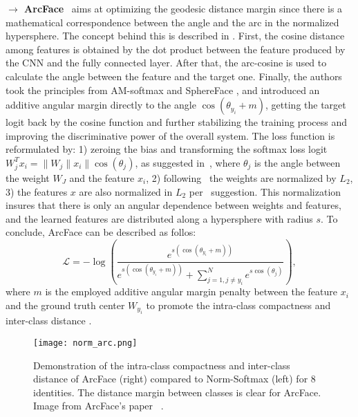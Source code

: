 \documentclass[class=report, crop=false, a4paper, 12pt]{standalone}
\begin{document}
\noindent\textbf{$\rightarrow$ ArcFace}~\autocite{dengArcFaceAdditiveAngular} aims at optimizing the geodesic distance margin since there is a mathematical correspondence between the angle and the arc in the normalized hypersphere. The concept behind this is described in . First, the cosine distance among features is obtained by the dot product between the feature produced by the CNN and the fully connected layer. After that, the arc-cosine is used to calculate the angle between the feature and the target one. Finally, the authors took the principles from AM-softmax \autocite{wangAdditiveMarginSoftmax2018} and SphereFace \autocite{liuSphereFaceDeepHypersphere2018}, and introduced an additive angular margin directly to the angle $\cos{(\theta_{y_i}+m)}$, getting the target logit back by the cosine function and further stabilizing the training process and improving the discriminative power of the overall system. The loss function is reformulated by: 1) zeroing the bias and transforming the softmax loss logit $W^{T}_{j}x_i=\|W_j\|x_i\|\cos{(\theta_j)}$, as suggested in~\autocite{liuSphereFaceDeepHypersphere2018}, where $\theta_j$ is the angle between the weight $W_J$ and the feature $x_i$, 2) following~\autocite{wangNormFaceL2Hypersphere2017,liuSphereFaceDeepHypersphere2018,wangCosFaceLargeMargin2018} the weights are normalized by $L_2$, 3) the features $x$ are also normalized in $L_2$ per~\autocite{ranjanL2constrainedSoftmaxLoss2017,wangNormFaceL2Hypersphere2017,wangAdditiveMarginSoftmax2018,wangCosFaceLargeMargin2018} suggestion. This normalization insures that there is only an angular dependence between weights and features, and the learned features are distributed along a hypersphere with radius $s$. To conclude, ArcFace can be described as follos:
\begin{equation}
\mathcal{L}=-\log\left(
                \frac{e^{s(\cos{(\theta_{y_i}+m)})}}
                {e^{s(\cos{(\theta_{y_i}+m)})} + \sum_{j=1, j\neq y_i}^{N}e^{s \cos{(\theta_j)}}}
            \right),
\end{equation}
\noindent where $m$ is the employed additive angular margin penalty between the feature $x_i$ and the ground truth center $W_{y_i}$ to promote the intra-class compactness and inter-class distance .

\begin{figure}[H]
    \centering
    \texttt{[image: norm\_arc.png]}
    \caption[Demonstration of the intra-class compactness and inter-class distance of ArcFace compared to Norm-Softmax for 8 identities.]{Demonstration of the intra-class compactness and inter-class distance of ArcFace (right) compared to Norm-Softmax (left) for 8 identities. The distance margin between classes is clear for ArcFace. Image from ArcFace's paper ~\autocite{dengArcFaceAdditiveAngular}.}
    \label{fig:norm_arcface}
\end{figure}
\end{document}
